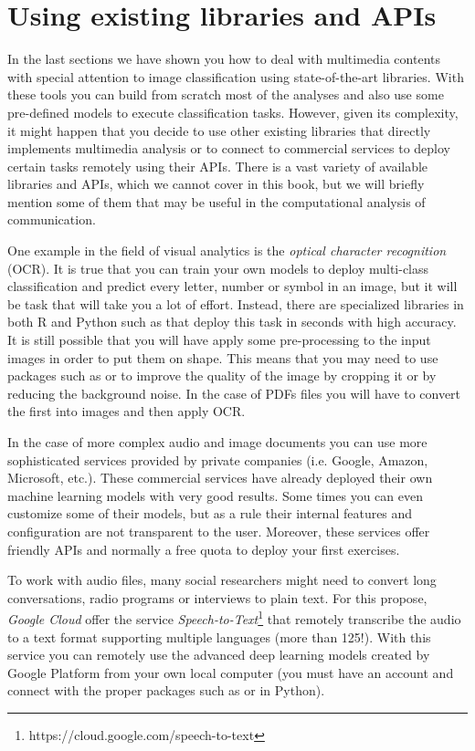 \section{Using existing libraries and APIs}
\label{sec:apivisions}

In the last sections we have shown you how to deal with multimedia contents with special attention to image classification using state-of-the-art libraries. With these tools you can build from scratch most of the analyses and also use some pre-defined models to execute classification tasks. However, given its complexity, it might happen that you decide to use other existing libraries that directly implements multimedia analysis or to connect to commercial services to deploy certain tasks remotely using their APIs. There is a vast variety of available libraries and APIs, which we cannot cover in this book, but we will briefly mention some of them that may be useful in the computational analysis of communication.

One example in the field of visual analytics is the \textit{optical character recognition} (OCR). It is true that you can train your own models to deploy multi-class classification and predict every letter, number or symbol in an image, but it will be task that will take you a lot of effort. Instead, there are specialized libraries in both R and Python such as  that deploy this task in seconds with high accuracy. It is still possible that you will have apply some pre-processing to the input images in order to put them on shape. This means that you may need to use packages such as  or  to improve the quality of the image by cropping it or by reducing the background noise.  In the case of PDFs files you will have to convert the first into images and then apply OCR.

In the case of more complex audio and image documents you can use more sophisticated services provided by private companies (i.e. Google, Amazon, Microsoft, etc.). These commercial services have already deployed their own machine learning models with very good results. Some times you can even customize some of their models, but as a rule their internal features and configuration are not transparent to the user. Moreover, these services offer friendly APIs and normally a free quota to deploy your first exercises.

To work with audio files, many social researchers might need to convert long conversations, radio programs or interviews to plain text. For this propose, \textit{Google Cloud} offer the service \textit{Speech-to-Text}\footnote{https://cloud.google.com/speech-to-text}  that remotely transcribe the audio to a text format supporting multiple languages (more than 125!). With this service you can remotely use the advanced deep learning models created by Google Platform from your own local computer (you must have an account and connect with the proper packages such as  or  in Python).

